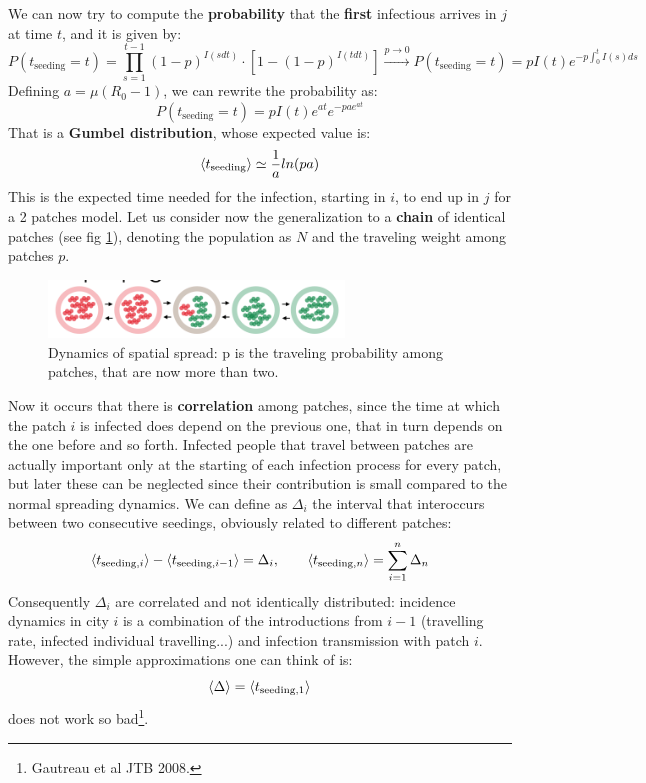 \documentclass[../main/main.tex]{subfiles}
\begin{document}
We can now try to compute the \textbf{probability} that the \textbf{first} infectious arrives in $j$ at time $t$, and it is given by:
\begin{equation}
    P(t_{\text{seeding}}=t) = \prod_{s=1}^{t-1} (1-p)^{I(sdt)}\cdot [1-(1-p)^{I(tdt)}] \xrightarrow{p \to 0} P(t_{\text{seeding}}=t) = p I(t) e^{-p \int_0^t I(s)ds}
\end{equation}
Defining $a = \mu (R_0 - 1)$, we can rewrite the probability as:
\begin{equation}
    P(t_{\text{seeding}}=t) = p I(t) e^{at}e^{-pae^{at}}
\end{equation}
That is a \textbf{Gumbel distribution}, whose expected value is:
\begin{equation}
    \expval{t_{\text{seeding}}} \simeq \frac{1}{a} ln(pa)
\end{equation}
This is the expected time needed for the infection, starting in $i$, to end up in $j$ for a 2 patches model.
Let us consider now the generalization to a \textbf{chain} of identical patches (see fig \ref{fig:14_02}), denoting the population as $N$ and the traveling weight among patches $p$.

\begin{figure}[h!]
\centering
\includegraphics[width=0.7\textwidth]{../lessons/image/15/image02.png}
\caption{\label{fig:14_02} Dynamics of spatial spread: p is the traveling probability among patches, that are now more than two.}
\end{figure}

Now it occurs that there is \textbf{correlation} among patches, since the time at which the patch $i$ is infected does depend on the previous one, that in turn depends on the one before and so forth. Infected people that travel between patches are actually important only at the starting of each infection process for every patch, but later these can be neglected since their contribution is small compared to the normal spreading dynamics. We can define as $\Delta_i$ the interval that interoccurs between two consecutive seedings, obviously related to different patches:
\begin{equation}
    \expval{t_{\text{seeding}, i}} - \expval{t_{\text{seeding}, i - 1}} = \Delta_i, \qquad \expval{t_{\text{seeding}, n}} = \sum_{i=1}^n \Delta_n
\end{equation}
Consequently $\Delta_i$ are correlated and not identically distributed: incidence dynamics in city $i$ is a combination of the introductions from $i-1$ (travelling rate, infected individual travelling...) and infection transmission with patch $i$. However, the simple approximations one can think of is:
\begin{equation*}
    \expval{\Delta} = \expval{t_{\text{seeding}, 1}}
\end{equation*}
does not work so bad\footnote{Gautreau et al JTB 2008.}.
\end{document}
